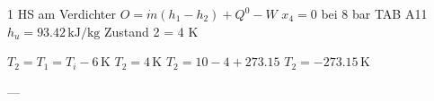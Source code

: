 1 HS am Verdichter  
\( O = \dot{m} (h_1 - h_2) + Q^0 - W \)  
\( x_4 = 0 \) bei 8 bar  
TAB A11 \( h_u = 93.42 \, \text{kJ/kg} \)  
Zustand 2 = 4 K  

\( T_2 = T_1 = T_i - 6 \, \text{K} \)  
\( T_2 = 4 \, \text{K} \)  
\( T_2 = 10 - 4 + 273.15 \)  
\( T_2 = -273.15 \, \text{K} \)  

---